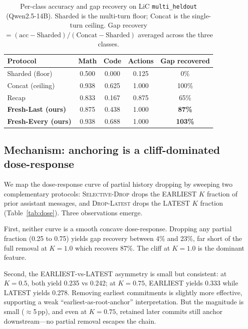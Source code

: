 \documentclass{article}
\begin{document}
\begin{table}[t]
\centering
\caption{Per-class accuracy and gap recovery on LiC \texttt{multi\_heldout} (Qwen2.5-14B). Sharded is the multi-turn floor; Concat is the single-turn ceiling. Gap recovery $= (\text{acc} - \text{Sharded}) / (\text{Concat} - \text{Sharded})$ averaged across the three classes.}
\label{tab:main}
\begin{tabular}{lcccc}
\toprule
Protocol & Math & Code & Actions & Gap recovered \\
\midrule
Sharded (floor) & 0.500 & 0.000 & 0.125 & 0\% \\
Concat (ceiling) & 0.938 & 0.625 & 1.000 & 100\% \\
\midrule
Recap~\citep{laban2025lost} & 0.833 & 0.167 & 0.875 & 65\% \\
\textbf{Fresh-Last (ours)} & 0.875 & 0.438 & 1.000 & \textbf{87\%} \\
\textbf{Fresh-Every (ours)} & 0.938 & 0.688 & 1.000 & \textbf{103\%} \\
\bottomrule
\end{tabular}
\end{table}

\subsection{Mechanism: anchoring is a cliff-dominated dose-response}
\label{sec:selective-drop}

We map the dose-response curve of partial history dropping by sweeping two complementary protocols: \textsc{Selective-Drop} drops the EARLIEST $K$ fraction of prior assistant messages, and \textsc{Drop-Latest} drops the LATEST $K$ fraction (Table~\ref{tab:dose}). Three observations emerge.

First, neither curve is a smooth concave dose-response. Dropping any partial fraction (0.25 to 0.75) yields gap recovery between 4\% and 23\%, far short of the full removal at $K=1.0$ which recovers 87\%. The cliff at $K=1.0$ is the dominant feature.

Second, the EARLIEST-vs-LATEST asymmetry is small but consistent: at $K=0.5$, both yield 0.235 vs 0.242; at $K=0.75$, EARLIEST yields 0.333 while LATEST yields 0.278. Removing earliest commitments is slightly more effective, supporting a weak ``earliest-as-root-anchor'' interpretation. But the magnitude is small ($\approx$5\,pp), and even at $K=0.75$, retained later commits still anchor downstream---no partial removal escapes the chain.
\end{document}
